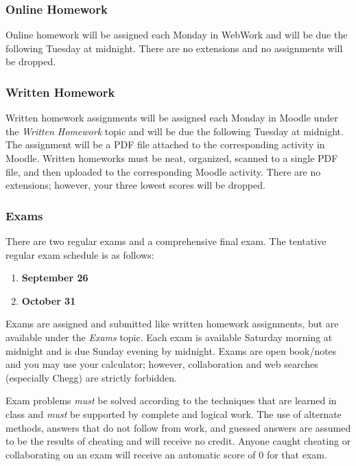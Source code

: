 \documentclass[letterpaper,12pt,fleqn]{article}
\begin{document}
\subsubsection*{Online Homework}

Online homework will be assigned each Monday in WebWork and will be due the following Tuesday at midnight.  There
are no extensions and no assignments will be dropped.

\subsubsection*{Written Homework}

Written homework assignments will be assigned each Monday in Moodle under the \emph{Written Homework} topic and
will be due the following Tuesday at midnight.  The assignment will be a PDF file attached to the corresponding
activity in Moodle.  Written homeworks must be neat, organized, scanned to a single PDF file, and then uploaded to
the corresponding Moodle activity.  There are no extensions; however, your three lowest scores will be dropped.

\subsubsection*{Exams}

There are two regular exams and a comprehensive final exam.  The tentative regular exam schedule is as follows:

\begin{enumerate}
\item \textbf{September 26}
\item \textbf{October 31}
\end{enumerate}

Exams are assigned and submitted like written homework assignments, but are available under the \emph{Exams} topic.
Each exam is available Saturday morning at midnight and is due Sunday evening by midnight.  Exams are open
book/notes and you may use your calculator; however, collaboration and web searches (especially Chegg) are strictly
forbidden.

Exam problems \emph{must} be solved according to the techniques that are learned in class and \emph{must} be
supported by complete and logical work.  The use of alternate methods, answers that do not follow from work, and
guessed answers are assumed to be the results of cheating and will receive no credit.  Anyone caught cheating or
collaborating on an exam will receive an automatic score of \(0\) for that exam.
\end{document}
